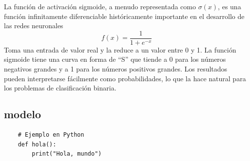 \documentclass[12pt]{article}
\begin{document}
      La función de activación sigmoide, a menudo representada como \(\sigma(x)\), es una función infinitamente diferenciable 
      históricamente importante en el desarrollo de las redes neuronales
      \[ f(x) = \frac{1}{1+e^{-x}}\]
      Toma una entrada de valor real y la reduce a un valor entre 0 y 1. La función sigmoide tiene una curva en forma de ``S'' 
      que tiende a 0 para los números negativos grandes y a 1 para los números positivos grandes. Los resultados pueden interpretarse 
      fácilmente como probabilidades, lo que la hace natural para los problemas de clasificación binaria.
    
  \subsection{modelo}
  
  \begin{verbatim}
    # Ejemplo en Python
    def hola():
        print("Hola, mundo")
    \end{verbatim}
   
\end{document}
